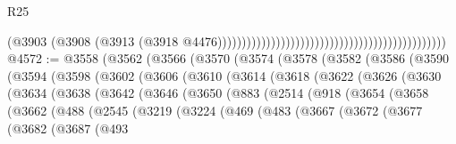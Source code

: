 \begin{lexlean}{R25}
\begin{coremodule}
                                                                                          (@3903
                                                                                            (@3908
                                                                                              (@3913
                                                                                                (@3918
                                                                                                  @4476)))))))))))))))))))))))))))))))))))))))))))))))
@4572 := @3558
    (@3562
      (@3566
        (@3570
          (@3574
            (@3578
              (@3582
                (@3586
                  (@3590
                    (@3594
                      (@3598
                        (@3602
                          (@3606
                            (@3610
                              (@3614
                                (@3618
                                  (@3622
                                    (@3626
                                      (@3630
                                        (@3634
                                          (@3638
                                            (@3642
                                              (@3646
                                                (@3650
                                                  (@883
                                                    (@2514
                                                      (@918
                                                        (@3654
                                                          (@3658
                                                            (@3662
                                                              (@488
                                                                (@2545
                                                                  (@3219
                                                                    (@3224
                                                                      (@469
                                                                        (@483
                                                                          (@3667
                                                                            (@3672
                                                                              (@3677
                                                                                (@3682
                                                                                  (@3687
                                                                                    (@493

\end{coremodule}
\end{lexlean}
